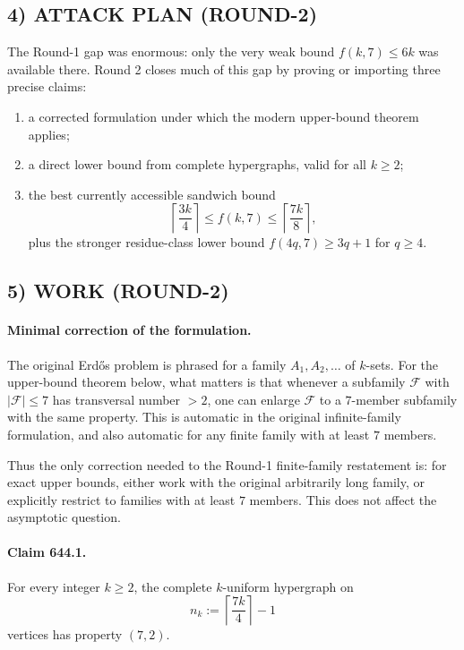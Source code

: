 \subsection*{4) ATTACK PLAN (ROUND-2)}
The Round-1 gap was enormous: only the very weak bound $f(k,7)\le 6k$ was available there.
Round 2 closes much of this gap by proving or importing three precise claims:

\begin{enumerate}
\item a corrected formulation under which the modern upper-bound theorem applies;
\item a direct lower bound from complete hypergraphs, valid for all $k\ge 2$;
\item the best currently accessible sandwich bound
\[
\left\lceil\frac{3k}{4}\right\rceil
\le f(k,7)
\le \left\lceil\frac{7k}{8}\right\rceil,
\]
plus the stronger residue-class lower bound $f(4q,7)\ge 3q+1$ for $q\ge 4$.
\end{enumerate}

\subsection*{5) WORK (ROUND-2)}
\paragraph{Minimal correction of the formulation.}
The original Erd\H{o}s problem is phrased for a family $A_1,A_2,\dots$ of $k$-sets.  For the upper-bound theorem below, what matters is that whenever a subfamily $\mathcal F$ with $|\mathcal F|\le 7$ has transversal number $>2$, one can enlarge $\mathcal F$ to a $7$-member subfamily with the same property.  This is automatic in the original infinite-family formulation, and also automatic for any finite family with at least $7$ members.

Thus the only correction needed to the Round-1 finite-family restatement is: for exact upper bounds, either work with the original arbitrarily long family, or explicitly restrict to families with at least $7$ members.  This does not affect the asymptotic question.

\paragraph{Claim 644.1.}
For every integer $k\ge 2$, the complete $k$-uniform hypergraph on
\[
 n_k:=\left\lceil \frac{7k}{4}\right\rceil-1
\]
vertices has property $(7,2)$.

